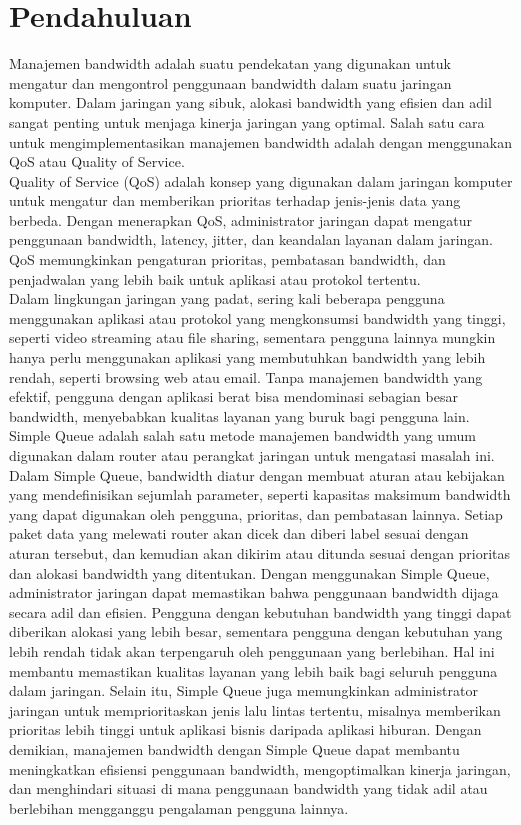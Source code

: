 \section{Pendahuluan}
\indent Manajemen bandwidth adalah suatu pendekatan yang digunakan untuk mengatur dan mengontrol
penggunaan bandwidth dalam suatu jaringan komputer. Dalam jaringan yang sibuk, alokasi bandwidth yang efisien dan adil sangat penting untuk menjaga kinerja jaringan yang optimal. Salah satu cara
untuk mengimplementasikan manajemen bandwidth adalah dengan menggunakan QoS atau Quality
of Service.
\\ \indent Quality of Service (QoS) adalah konsep yang digunakan dalam jaringan komputer untuk mengatur dan memberikan prioritas terhadap jenis-jenis data yang berbeda. Dengan menerapkan QoS,
administrator jaringan dapat mengatur penggunaan bandwidth, latency, jitter, dan keandalan layanan
dalam jaringan. QoS memungkinkan pengaturan prioritas, pembatasan bandwidth, dan penjadwalan
yang lebih baik untuk aplikasi atau protokol tertentu.
\\ \indent Dalam lingkungan jaringan yang padat, sering kali beberapa pengguna menggunakan aplikasi atau
protokol yang mengkonsumsi bandwidth yang tinggi, seperti video streaming atau file sharing, sementara pengguna lainnya mungkin hanya perlu menggunakan aplikasi yang membutuhkan bandwidth yang lebih rendah, seperti browsing web atau email. Tanpa manajemen bandwidth yang efektif,
pengguna dengan aplikasi berat bisa mendominasi sebagian besar bandwidth, menyebabkan kualitas layanan yang buruk bagi pengguna lain. Simple Queue adalah salah satu metode manajemen
bandwidth yang umum digunakan dalam router atau perangkat jaringan untuk mengatasi masalah ini.
\\ \indent Dalam Simple Queue, bandwidth diatur dengan membuat aturan atau kebijakan yang mendefinisikan
sejumlah parameter, seperti kapasitas maksimum bandwidth yang dapat digunakan oleh pengguna,
prioritas, dan pembatasan lainnya. Setiap paket data yang melewati router akan dicek dan diberi label sesuai dengan aturan tersebut, dan kemudian akan dikirim atau ditunda sesuai dengan prioritas
dan alokasi bandwidth yang ditentukan. Dengan menggunakan Simple Queue, administrator jaringan
dapat memastikan bahwa penggunaan bandwidth dijaga secara adil dan efisien. Pengguna dengan
kebutuhan bandwidth yang tinggi dapat diberikan alokasi yang lebih besar, sementara pengguna dengan kebutuhan yang lebih rendah tidak akan terpengaruh oleh penggunaan yang berlebihan. Hal
ini membantu memastikan kualitas layanan yang lebih baik bagi seluruh pengguna dalam jaringan.
Selain itu, Simple Queue juga memungkinkan administrator jaringan untuk memprioritaskan jenis lalu
lintas tertentu, misalnya memberikan prioritas lebih tinggi untuk aplikasi bisnis daripada aplikasi hiburan. Dengan demikian, manajemen bandwidth dengan Simple Queue dapat membantu meningkatkan
efisiensi penggunaan bandwidth, mengoptimalkan kinerja jaringan, dan menghindari situasi di mana
penggunaan bandwidth yang tidak adil atau berlebihan mengganggu pengalaman pengguna lainnya.

